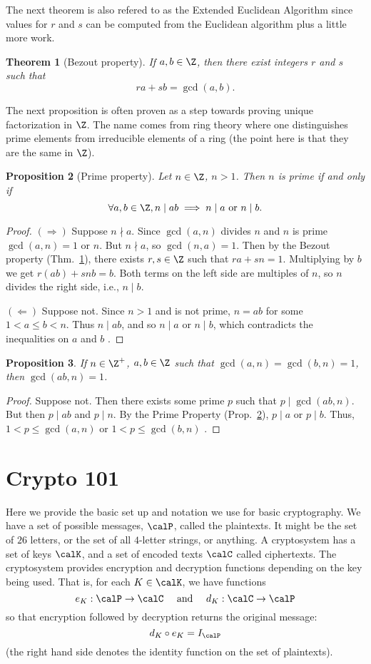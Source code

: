 \documentclass[12pt]{amsart}
\theoremstyle{plain}
\newtheorem{thm}{Theorem}[section]
\newtheorem{prop}[thm]{Proposition}
\theoremstyle{definition}
\theoremstyle{remark}
\begin{document}
The next theorem is also refered to as the Extended Euclidean
Algorithm since values for $r$ and $s$ can be computed from the
Euclidean algorithm plus a little more work.

\begin{thm}[Bezout property] \label{bezout}
  If $a,b\in\Z$, then there exist integers $r$ and $s$ such that
  $$ ra+sb=\gcd(a,b).$$
\end{thm}

The next proposition is often proven as a step towards proving unique
factorization in $\Z$.  The name comes from ring theory where one
distinguishes prime elements from irreducible elements of a ring (the
point here is that they are the same in $\Z$).

\begin{prop}[Prime property] \label{prime-prop}
  Let $n\in\Z$, $n>1$.  Then $n$ is prime if and only if
  \[ \forall a,b\in\Z, n\mid ab\implies n\mid a \text{ or } n\mid b.\]
\end{prop}
\begin{proof}
  $(\Rightarrow)$ Suppose $n\nmid a$.  Since $\gcd(a,n)$ divides $n$
  and $n$ is prime $\gcd(a,n)=1$ or $n$.  But $n\nmid a$, so
  $\gcd(n,a)=1$.  Then by the Bezout property (Thm.~\ref{bezout}), there
  exists $r,s\in\Z$ such that $ra+sn=1$.  Multiplying by $b$ we get
  $r(ab) + snb = b$.  Both terms on the left side are multiples of $n$,
  so $n$ divides the right side, i.e., $n\mid b$.

$(\Leftarrow)$
Suppose not.  Since $n>1$ and is not prime, $n=ab$ for some $1<a\leq
b<n$.  Thus $n\mid ab$, and so $n\mid a$ or $n\mid b$, which
contradicts the inequalities on $a$ and $b$ \con.
\end{proof}

\begin{prop}
  If $n\in\Z^+$, $a,b\in\Z$ such that $\gcd(a,n)=\gcd(b,n)=1$, then
  $\gcd(ab,n)=1$.
\end{prop}
\begin{proof}
  Suppose not.  Then there exists some prime $p$ such that $p\mid
  \gcd(ab,n)$.  But then $p\mid ab$ and $p\mid n$.  By the Prime
  Property (Prop.~\ref{prime-prop}), $p\mid a$ or $p\mid b$.  Thus, $1<p\leq
  \gcd(a,n)$ or $1<p\leq \gcd(b,n)$ \con.
\end{proof}

\section{Crypto 101}
\label{crypto-101}
Here we provide the basic set up and notation we use for basic
cryptography.  We have a set of possible messages, $\calP$, called the
plaintexts.  It might be the set of $26$ letters, or the set of all
$4$-letter strings, or anything.  A cryptosystem has a set of keys
$\calK$, and a set of encoded  texts $\calC$ called ciphertexts.  The
cryptosystem provides encryption and decryption functions depending on
the key being used.  That is, for each $K\in\calK$, we have functions
\[ e_K:\calP\to \calC \quad \text{ and }\quad d_K:\calC\to \calP\]
so that encryption followed by decryption returns the original
message:
\[ d_K\circ e_K = I_{\calP}\]
(the right hand side denotes the identity function on the set of
plaintexts).
\end{document}
